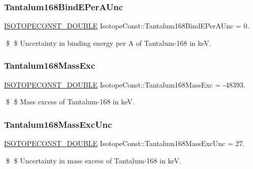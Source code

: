 \subsubsection{\texorpdfstring{Tantalum168\+Bind\+E\+Per\+A\+Unc}{Tantalum168BindEPerAUnc}}
{\footnotesize\ttfamily \mbox{\hyperlink{group___isotope_const-_macros_ga8f45a7272ce02c0b4c65c44636ed719a}{I\+S\+O\+T\+O\+P\+E\+C\+O\+N\+S\+T\+\_\+\+D\+O\+U\+B\+LE}} Isotope\+Const\+::\+Tantalum168\+Bind\+E\+Per\+A\+Unc = 0.}

\$ \$ Uncertainty in binding energy per A of Tantalum-\/168 in keV. \mbox{\label{group___isotope_const-_tantalum-_ta168_ga5b59666d82cfbc1f79fcc8da48f11fa7}} 
\subsubsection{\texorpdfstring{Tantalum168\+Mass\+Exc}{Tantalum168MassExc}}
{\footnotesize\ttfamily \mbox{\hyperlink{group___isotope_const-_macros_ga8f45a7272ce02c0b4c65c44636ed719a}{I\+S\+O\+T\+O\+P\+E\+C\+O\+N\+S\+T\+\_\+\+D\+O\+U\+B\+LE}} Isotope\+Const\+::\+Tantalum168\+Mass\+Exc = -\/48393.}

\$ \$ Mass excess of Tantalum-\/168 in keV. \mbox{\label{group___isotope_const-_tantalum-_ta168_ga109981aa9dc1b092afa7db23e93d3cc5}} 
\subsubsection{\texorpdfstring{Tantalum168\+Mass\+Exc\+Unc}{Tantalum168MassExcUnc}}
{\footnotesize\ttfamily \mbox{\hyperlink{group___isotope_const-_macros_ga8f45a7272ce02c0b4c65c44636ed719a}{I\+S\+O\+T\+O\+P\+E\+C\+O\+N\+S\+T\+\_\+\+D\+O\+U\+B\+LE}} Isotope\+Const\+::\+Tantalum168\+Mass\+Exc\+Unc = 27.}

\$ \$ Uncertainty in mass excess of Tantalum-\/168 in keV. \mbox{\label{group___isotope_const-_tantalum-_ta168_gaf558884f2f598b320e50a37a79b6aca3}} 
